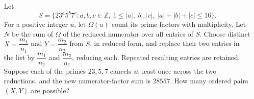 Let
\[
S=\{23^a5^b7^c:a,b,c\in\mathbb Z,\ 1\le|a|,|b|,|c|,\ |a|+|b|+|c|\le16\}.
\]
For a positive integer $u$, let $\Omega(u)$ count its prime factors with multiplicity. Let $N$ be the sum of $\Omega$ of the reduced numerator over all entries of $S$. Choose distinct $X=\dfrac{m_1}{n_1}$ and $Y=\dfrac{m_2}{n_2}$ from $S$, in reduced form, and replace their two entries in the list by $\dfrac{m_1}{n_2}$ and $\dfrac{m_2}{n_1}$, reducing each. Repeated resulting entries are retained. Suppose each of the primes $23,5,7$ cancels at least once across the two reductions, and the new numerator-factor sum is $28557$. How many ordered pairs $(X,Y)$ are possible?
